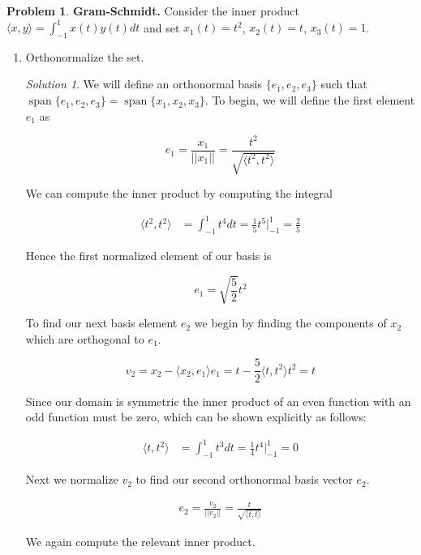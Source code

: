 \documentclass[12pt,a4paper]{article}
\theoremstyle{definition}
\newtheorem{problem}{Problem}
\theoremstyle{remark}
\newtheorem*{solution}{Solution}
\begin{document}
\begin{problem}
    \textbf{Gram-Schmidt.} Consider the inner product $\langle x, y \rangle = \int_{-1}^1 x(t) y(t) dt$ and set $x_1(t) =t^2$, $x_2(t) =t$, $x_3(t) =1$. 

    \begin{enumerate}
        \item Orthonormalize the set.
        \begin{solution}
            We will define an orthonormal basis $\{e_1, e_2, e_3\}$ such that $\operatorname{span} \{e_1, e_2, e_3\} = \operatorname{span} \{x_1, x_2, x_3\}$. To begin, we will define the first element $e_1$ as 
            
            $$e_1 = \frac{x_1}{||x_1||} = \frac{t^2}{\sqrt{\langle t^2, t^2 \rangle}}$$

            We can compute the inner product by computing the integral 

            \begin{align*}
                \langle t^2, t^2 \rangle &= \int_{-1}^1 t^4 dt = \frac{1}{5} t^5 \Bigg|_{-1}^1 = \frac{2}{5}
            \end{align*}

            Hence the first normalized element of our basis is 

            $$e_1 = \sqrt{\frac{5}{2}} t^2$$

            To find our next basis element $e_2$ we begin by finding the components of $x_2$ which are orthogonal to $e_1$. 

            $$v_2 = x_2 - \langle x_2, e_1 \rangle e_1 = t - \frac{5}{2}\langle t, t^2 \rangle t^2= t$$

            Since our domain is symmetric the inner product of an even function with an odd function must be zero, which can be shown explicitly as follows:

            \begin{align*}
                \langle t, t^2 \rangle &= \int_{-1}^1 t^3 dt = \frac{1}{4} t^4 \Bigg|_{-1}^1 = 0
            \end{align*}

            Next we normalize $v_2$ to find our second orthonormal basis vector $e_2$. 

            \begin{align*}
                e_2 = \frac{v_2}{||v_2||} = \frac{t}{\sqrt{\langle t, t \rangle}}
            \end{align*}

            We again compute the relevant inner product.


\end{solution}
\end{enumerate}
\end{problem}
\end{document}
